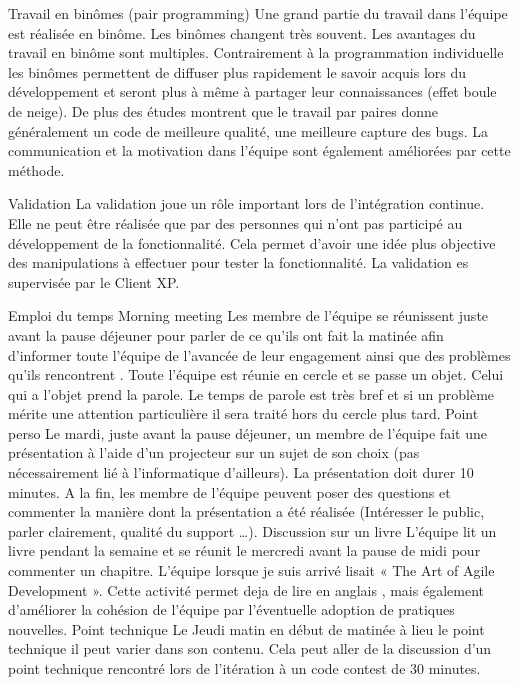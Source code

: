 Travail en binômes (pair programming)
Une grand partie du travail dans l'équipe est réalisée en binôme. Les binômes changent très souvent. Les avantages du travail en binôme sont multiples. Contrairement à la programmation individuelle les binômes permettent de diffuser plus rapidement le savoir acquis lors du développement et seront plus à même à partager leur connaissances (effet boule de neige). De plus des études montrent que le travail par paires donne généralement un code de meilleure qualité, une meilleure capture des bugs. La communication et la motivation dans l'équipe sont également améliorées par cette méthode.


Validation
La validation joue un rôle important lors de l'intégration continue. Elle ne peut être réalisée que par des personnes qui n'ont pas participé au développement de la fonctionnalité. Cela permet d'avoir une idée plus objective des manipulations à effectuer pour tester la fonctionnalité. La validation es supervisée par le Client XP.


Emploi du temps
Morning meeting
Les membre de l'équipe se réunissent juste avant la pause déjeuner pour parler de ce qu'ils ont fait la matinée afin d'informer toute l'équipe de l'avancée de leur engagement ainsi que des problèmes qu'ils rencontrent . Toute l'équipe est réunie en cercle et se passe un objet. Celui qui a l'objet prend la parole. Le temps de parole est très bref et si un problème mérite une attention particulière il sera traité hors du cercle plus tard.
Point perso
Le mardi, juste avant la pause déjeuner, un membre de l'équipe fait une présentation à l'aide d'un projecteur sur un sujet de son choix (pas nécessairement lié à l'informatique d'ailleurs). La présentation doit durer 10 minutes. A la fin, les membre de l'équipe peuvent poser des questions et commenter la manière dont la présentation a été réalisée (Intéresser le public, parler clairement, qualité du support …).
Discussion sur un livre
L'équipe lit un livre pendant la semaine et se réunit le mercredi avant la pause de midi pour commenter un chapitre. L'équipe lorsque je suis arrivé lisait « The Art of Agile Development ». Cette activité permet deja de lire en anglais , mais également d'améliorer la cohésion de l'équipe par l'éventuelle adoption de pratiques nouvelles.
Point technique
Le Jeudi matin en début de matinée à lieu le point technique il peut varier dans son contenu. Cela peut aller de la discussion d'un point technique rencontré lors de l'itération à un code contest de 30 minutes.


